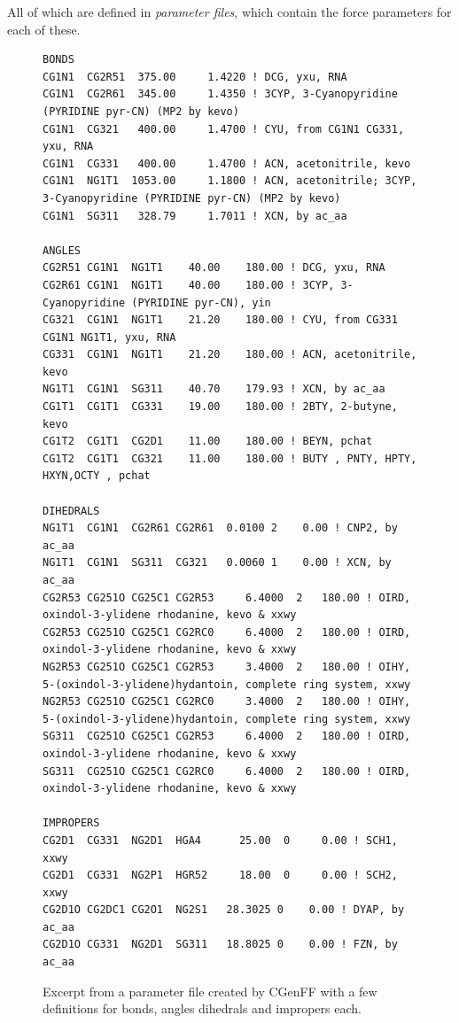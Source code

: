 \documentclass[oneside]{scrreprt}
\begin{document}
All of which are defined in \emph{parameter files}, which contain the force parameters for each of these.

\begin{figure}
\tiny
\begin{verbatim}
BONDS
CG1N1  CG2R51  375.00     1.4220 ! DCG, yxu, RNA
CG1N1  CG2R61  345.00     1.4350 ! 3CYP, 3-Cyanopyridine (PYRIDINE pyr-CN) (MP2 by kevo)
CG1N1  CG321   400.00     1.4700 ! CYU, from CG1N1 CG331, yxu, RNA
CG1N1  CG331   400.00     1.4700 ! ACN, acetonitrile, kevo
CG1N1  NG1T1  1053.00     1.1800 ! ACN, acetonitrile; 3CYP, 3-Cyanopyridine (PYRIDINE pyr-CN) (MP2 by kevo)
CG1N1  SG311   328.79     1.7011 ! XCN, by ac_aa            

ANGLES
CG2R51 CG1N1  NG1T1    40.00    180.00 ! DCG, yxu, RNA
CG2R61 CG1N1  NG1T1    40.00    180.00 ! 3CYP, 3-Cyanopyridine (PYRIDINE pyr-CN), yin
CG321  CG1N1  NG1T1    21.20    180.00 ! CYU, from CG331 CG1N1 NG1T1, yxu, RNA
CG331  CG1N1  NG1T1    21.20    180.00 ! ACN, acetonitrile, kevo
NG1T1  CG1N1  SG311    40.70    179.93 ! XCN, by ac_aa                
CG1T1  CG1T1  CG331    19.00    180.00 ! 2BTY, 2-butyne, kevo
CG1T2  CG1T1  CG2D1    11.00    180.00 ! BEYN, pchat
CG1T2  CG1T1  CG321    11.00    180.00 ! BUTY , PNTY, HPTY, HXYN,OCTY , pchat

DIHEDRALS
NG1T1  CG1N1  CG2R61 CG2R61  0.0100 2    0.00 ! CNP2, by ac_aa
NG1T1  CG1N1  SG311  CG321   0.0060 1    0.00 ! XCN, by ac_aa
CG2R53 CG251O CG25C1 CG2R53     6.4000  2   180.00 ! OIRD, oxindol-3-ylidene rhodanine, kevo & xxwy
CG2R53 CG251O CG25C1 CG2RC0     6.4000  2   180.00 ! OIRD, oxindol-3-ylidene rhodanine, kevo & xxwy
NG2R53 CG251O CG25C1 CG2R53     3.4000  2   180.00 ! OIHY, 5-(oxindol-3-ylidene)hydantoin, complete ring system, xxwy
NG2R53 CG251O CG25C1 CG2RC0     3.4000  2   180.00 ! OIHY, 5-(oxindol-3-ylidene)hydantoin, complete ring system, xxwy
SG311  CG251O CG25C1 CG2R53     6.4000  2   180.00 ! OIRD, oxindol-3-ylidene rhodanine, kevo & xxwy
SG311  CG251O CG25C1 CG2RC0     6.4000  2   180.00 ! OIRD, oxindol-3-ylidene rhodanine, kevo & xxwy

IMPROPERS
CG2D1  CG331  NG2D1  HGA4      25.00  0     0.00 ! SCH1, xxwy
CG2D1  CG331  NG2P1  HGR52     18.00  0     0.00 ! SCH2, xxwy
CG2D1O CG2DC1 CG2O1  NG2S1   28.3025 0    0.00 ! DYAP, by ac_aa              
CG2D1O CG331  NG2D1  SG311   18.8025 0    0.00 ! FZN, by ac_aa
\end{verbatim}
   \caption{Excerpt from a parameter file created by CGenFF with a few definitions for bonds, angles dihedrals and impropers each.}
    \label{fig:parmfile}
\end{figure}
\end{document}
